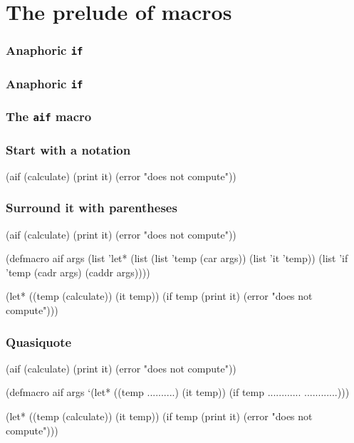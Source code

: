 \documentclass[hyperref={bookmarks=false}]{beamer}
\begin{document}
\section{The prelude of macros}

\begin{frame}[fragile]
\frametitle<1>{Anaphoric \texttt{if}}
\frametitle<2>{Anaphoric \texttt{if}}
\frametitle<3>{The \texttt{aif} macro}
\frametitle<4->{Start with a notation}
\begin{semiverbatim}
(aif (calculate)
  (print it)
  (error "does not compute"))


\end{semiverbatim}
\end{frame}

\begin{frame}[fragile]
\frametitle{Surround it with parentheses}
\begin{semiverbatim}
(aif (calculate)
  (print it)
  (error "does not compute"))

(defmacro aif args
  \alert{(list '}let* \alert{(list (list '}temp  (car args))
  \alert{                  (list '}it \alert{'}temp\alert{))}
    \alert{(list '}if \alert{'}temp
             (cadr args)
             (caddr args)\alert{))})

(let* ((temp (calculate))
       (it temp))
  (if temp
    (print it)
    (error "does not compute")))
\end{semiverbatim}
\end{frame}

\begin{frame}[fragile]
\frametitle{Quasiquote}
\begin{semiverbatim}
(aif (calculate)
  (print it)
  (error "does not compute"))

(defmacro aif args
  \alert{     `}(let*            ((temp  ..........)
                          (it  temp))
          (if  temp
             ............
             ............)))

(let* ((temp (calculate))
       (it temp))
  (if temp
    (print it)
    (error "does not compute")))
\end{semiverbatim}
\end{frame}
\end{document}
